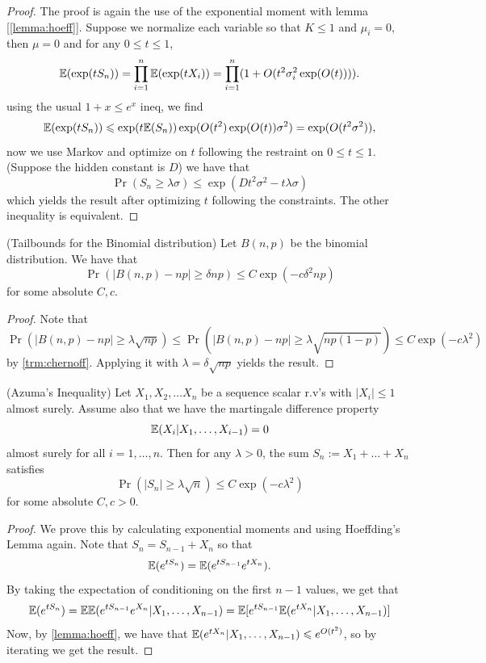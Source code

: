 \begin{proof}
	The proof is again the use of the exponential moment with lemma
	[\ref{lemma:hoeff}]. Suppose we normalize  each variable
	so that $K \leq 1$ and $\mu_i = 0$, then $\mu = 0$ and for any $0
	\leq t \leq 1$,
	\[
		\mathbb{E}(\exp(tS_n)) = \prod_{i=1}^{n} \mathbb{E}(\exp(tX_i)) = \prod_{i=1}^n
		(1 + O(t^2\sigma_i^2\exp(O(t)))).
	\]
	using the usual $1 + x \leq e^x$ ineq, we find
	\[
		\mathbb{E}(\exp(tS_n)) \leqslant \exp(t\mathbb{E}(S_n))\exp(O(t^2)\exp(O(t))\sigma^2)
		= \exp(O(t^2\sigma^2)),
	\]
	now we use Markov and optimize on $t$ following the restraint on $0
	\leq t \leq 1$. (Suppose the hidden constant is $D$)
	we have that
	\[
		\Pr(S_n \geq \lambda\sigma) \leq \exp(D t^2\sigma^2 - t\lambda\sigma)
	\]
	which yields the result after optimizing $t$ following the
	constraints. The other inequality is equivalent.

\end{proof}

\begin{corollary}
	\label{lemma:expec_binomial_bounds}
	(Tailbounds for the Binomial distribution) Let $B(n,p)$ be the
	binomial distribution.
	We have that
	\[
		\Pr(|B(n,p) - np| \geq \delta np) \leq C\exp(-c \delta^2 np)
	\]
	for some absolute $C,c$.
\end{corollary}
\begin{proof}
	Note that
	\[
		\Pr(|B(n,p) - np| \geq \lambda \sqrt{np}) \leq \Pr(|B(n,p) - np|
		\geq \lambda \sqrt{np(1-p)}) \leq C\exp(-c\lambda^2)
	\]
	by \ref{trm:chernoff}. Applying it with $\lambda = \delta
	\sqrt{np}$ yields the result.
\end{proof}

\begin{theorem}
	\label{trm:azuma_inequality}
	(Azuma's Inequality) Let $X_1, X_2, \dots X_n$ be a sequence scalar
	r.v's with $|X_i| \leq 1$ almost surely. Assume also
	that we have the martingale difference property
	\[
		\mathbb{E}(X_i | X_1, \dots, X_{i-1}) = 0
	\]
	almost surely for all $i = 1,\dots,n$. Then for any $\lambda > 0$,
	the sum $S_n := X_1 + \dots + X_n$ satisfies
	\[
		\Pr(|S_n| \geq \lambda \sqrt{n}) \leq C\exp(-c\lambda^2)
	\]
	for some absolute $C,c > 0$.
\end{theorem}

\begin{proof}
	We prove this by calculating exponential moments and using
	Hoeffding's Lemma again. Note that $S_n = S_{n-1} + X_n$ so that
	\[
		\mathbb{E}(e^{tS_n}) = \mathbb{E}(e^{tS_{n-1}}e^{tX_n}).
	\]
	By taking the expectation of conditioning on the first $n-1$
	values, we get that
	\[
		\mathbb{E}(e^{tS_n}) = \mathbb{E} \mathbb{E} (e^{tS_{n-1}}e^{X_n} | X_1, \dots,
		X_{n-1}) =\mathbb{E} [e^{tS_{n-1}}\mathbb{E}(e^{tX_n} | X_1, \dots, X_{n-1})]
	\]
	Now, by \ref{lemma:hoeff}, we have that $\mathbb{E}(e^{tX_n} | X_1, \dots,
	X_{n-1}) \leqslant e^{O(t^2)}$, so by iterating we get the result.
\end{proof}

